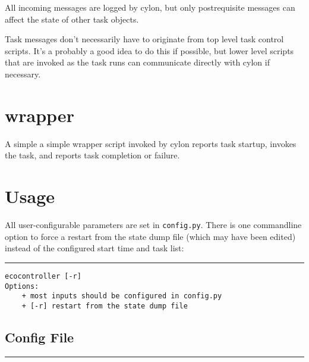 \documentclass[11pt,a4paper]{article}
\begin{document}
All incoming messages are logged by cylon, but only postrequisite
messages can affect the state of other task objects.

Task messages don't necessarily have to originate from top level task
control scripts. It's a probably a good idea to do this if possible, but
lower level scripts that are invoked as the task runs can communicate
directly with cylon if necessary.

\section{wrapper}

A simple a simple wrapper script invoked by cylon reports task
startup, invokes the task, and reports task completion or failure. 


\label{usage}
\section{Usage}

All user-configurable parameters are set in \verb#config.py#. There is
one commandline option to force a restart from the state dump file
(which may have been edited) instead of the configured start time and
task list:

\lstset{language=sh}

{\small

\noindent
\rule{5cm}{.2mm}
\begin{lstlisting}
ecocontroller [-r]
Options:
    + most inputs should be configured in config.py
    + [-r] restart from the state dump file
\end{lstlisting}
}

\lstset{language=Python}

\subsection{Config File}

{\small
\noindent
\rule{5cm}{.2mm}

}
\end{document}
